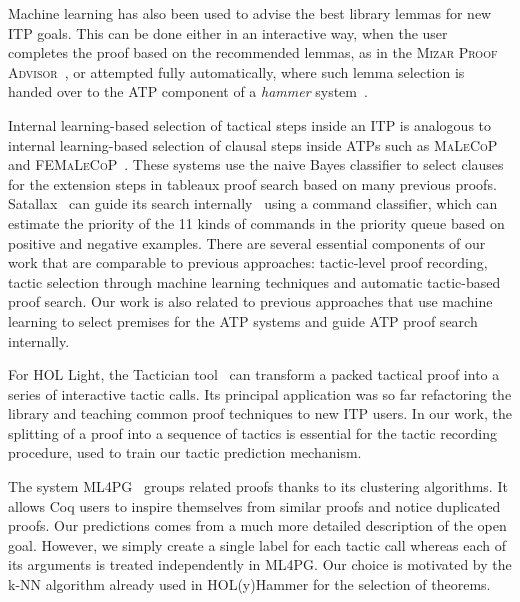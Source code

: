 \documentclass[runningheads,a4paper,draft]{svjour3}
\def\hollight{\textsf{HOL Light}\xspace}
\def\coq{\textsf{Coq}\xspace}
\def\holyhammer{\textsf{HOL(y)Hammer}\xspace}
\begin{document}
Machine learning has also been used to advise the best library lemmas for new 
ITP goals.
This can be done either in an interactive way, when the user completes the 
proof based on the recommended lemmas, as in the \textsc{Mizar Proof 
Advisor}~\cite{Urb04-MPTP0}, or attempted fully automatically, where such lemma 
selection is handed over to the ATP component of a \emph{hammer} 
system~\cite{hammers4qed,tgck-cpp15,holyhammer,BlanchetteGKKU16,mizAR40}.

Internal learning-based selection of tactical steps inside an ITP is analogous 
to internal learning-based selection of clausal steps inside ATPs such as 
\textsc{MaLeCoP}~\cite{malecop} and \textsc{FEMaLeCoP}~\cite{femalecop}. These 
systems
use the naive Bayes classifier to  select clauses for the extension steps in
tableaux proof search based on many previous proofs. Satallax~\cite{Brown2012a} 
can guide its
search internally~\cite{mllax} using a command classifier, which can estimate 
the priority of the 11 kinds of
commands in the priority queue based on positive and negative examples.
There are several essential components of our work that are comparable to 
previous approaches: tactic-level proof recording, tactic 
selection through machine learning techniques and automatic tactic-based proof 
search. Our work is also related to previous approaches that use machine 
learning to select premises for the ATP systems and guide ATP proof search 
internally.

For \hollight, the Tactician tool~\cite{DBLP:conf/sefm/Adams15} 
can transform a packed tactical proof into a series of interactive tactic 
calls. Its principal application 
was so far refactoring the library and teaching common proof techniques to new 
ITP users. In our work, the splitting of a proof into a sequence of tactics is 
essential for the
tactic recording procedure, used to train our tactic prediction mechanism.

The system \textsf{ML4PG}~\cite{DBLP:journals/corr/abs-1212-3618,DBLP:journals/mics/HerasK14} 
groups related proofs thanks to its clustering 
algorithms. It allows \coq users to inspire themselves from similar proofs and 
notice 
duplicated proofs. Our predictions comes from a much more detailed description 
of the open goal.
However, we simply create a single label for each tactic call whereas each of 
its
arguments is treated independently in \textsf{ML4PG}. 
Our choice is motivated by the k-NN algorithm already used in
\holyhammer for the selection of theorems.
\end{document}
